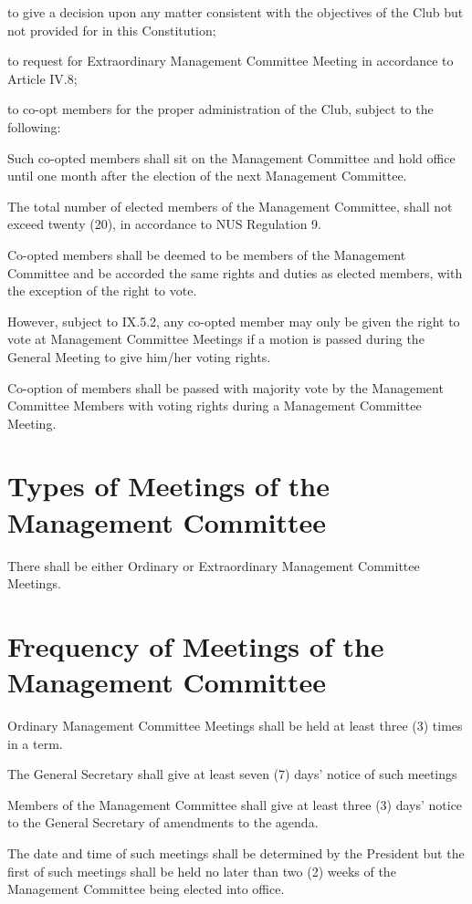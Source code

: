 \begin{legal}
\begin{legal}
		\end{legal}
	\item to give a decision upon any matter consistent with the objectives of the Club but not provided for in this Constitution;
	\item to request for Extraordinary Management Committee Meeting in accordance to Article IV.8;
	\item to co-opt members for the proper administration of the Club, subject to the following:
		\begin{legal}
		\item Such co-opted members shall sit on the Management Committee and hold office until one month after the election of the next Management Committee.
		\item The total number of elected members of the Management Committee, shall not exceed twenty (20), in accordance to NUS Regulation 9.
		\item Co-opted members shall be deemed to be members of the Management Committee and be accorded the same rights and duties as elected members, with the exception of the right to vote.
		\item However, subject to IX.5.2, any co-opted member may only be given the right to vote at Management Committee Meetings if a motion is passed during the General Meeting to give him/her voting rights.
		\item Co-option of members shall be passed with majority vote by the Management Committee Members with voting rights during a Management Committee Meeting.
		\end{legal}
	\end{legal}

\section{Types of Meetings of the Management Committee}
There shall be either Ordinary or Extraordinary Management Committee Meetings.

\section{Frequency of Meetings of the Management Committee}
Ordinary Management Committee Meetings shall be held at least three (3) times in a term.
	\begin{legal}
	\item The General Secretary shall give at least seven (7) days' notice of such meetings
	\item Members of the Management Committee shall give at least three (3) days' notice to the General Secretary of amendments to the agenda.
	\item The date and time of such meetings shall be determined by the President but the first of such meetings shall be held no later than two (2) weeks of the Management Committee being elected into office.
	\end{legal}

